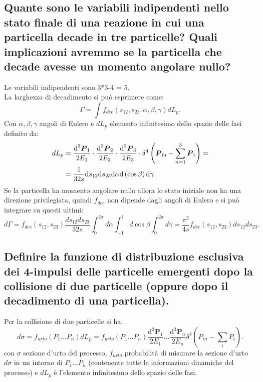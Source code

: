 \subsection[$\ $ Variabili indipendenti per il decadimento a tre corpi, considerazioni sul caso di Spin nullo]{Quante sono le variabili indipendenti nello stato finale di una reazione in cui una particella decade in tre particelle? Quali implicazioni avremmo se la particella che decade avesse un momento angolare nullo?}
Le variabili indipendenti sono 3*3-4 = 5.\\
La larghezza di decadimento si può esprimere come:
\[
	\Gamma = \int{f_{dec}\left( s_{12}, s_{23}, \alpha ,\beta,\gamma \right) dL_p}
.\] 
Con $\alpha, \beta,\gamma$ angoli di Eulero e $dL_p$ elemento infinitesimo dello spazio delle fasi definito da:
\begin{align*}
	dL_p &= \frac{\mbox{d}^3 \boldsymbol{P}_1}{2E_1}\cdot\frac{\mbox{d}^3 \boldsymbol{P}_2}{2E_2}\cdot\frac{\mbox{d}^3 \boldsymbol{P}_3}{2E_3}\cdot 
	\delta^4\left(\boldsymbol{P}_{\text{in}}- \sum_{n=1}^{3} \boldsymbol{P}_i  \right)=\\
	     &= \frac{1}{32s}\text{d}s_{12}\text{d}s_{23}\text{d}\alpha \text{d}\left( \cos\beta \right)\text{d}\gamma 
.\end{align*}
Se la particella ha momento angolare nullo allora lo stato iniziale non ha una direzione privilegiata, quindi $f_{dec}$ non dipende dagli angoli di Eulero e si può integrare su questi ultimi:
\[
	d\Gamma = f_{dec}\left( s_{12}, s_{23} \right) \frac{ds_{12}ds_{23}}{32s} \int_0^{2 \pi}{d\alpha \int_{-1}^1{d\cos\beta \int_0^{2\pi}{ d\gamma }}} = \frac{\pi^2}{4s} f_{dec}\left( s_{12}, s_{23} \right) ds_{12}ds_{23}
.\]
\subsection[$\ $ Funzione di distribuzione esclusiva dei 4-impulsi]{ Definire la funzione di distribuzione esclusiva dei 4-impulsi delle particelle emergenti dopo la collisione di due particelle (oppure dopo il decadimento di una particella).}
Per la collisione di due particelle si ha:
\[
	d\sigma = f_{urto}\left( P_1 \ldots P_n \right)dL_p = f_{urto}\left( P_1 \ldots P_n \right) \frac{\mbox{d}^3 \boldsymbol{P}_1}{2E_1}\ldots \frac{\mbox{d}^3 \boldsymbol{P}_n}{2E_n} \delta^4\left( P_{in}-\sum_{i}P_i \right) 
.\] 
con $\sigma$ sezione d'urto del processo, $f_{urto}$ probabilità di misurare la sezione d'urto $d\sigma$ in un intorno di $P_1 \ldots P_n$ (contenente tutte le informazioni dinamiche del processo) e $dL_p$ è l'elemento infinitesimo dello spazio delle fasi.

